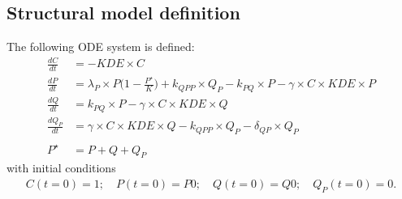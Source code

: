 \subsection{Structural model definition}
The following ODE system is defined:
\begin{align*}
\frac{dC}{dt} &= -\textit{KDE} \times C  \nonumber \\
\frac{dP}{dt} &= \lambda_P \times P \Big( 1 - \frac{P^\star}{K} \Big) + k_{\textit{QPP}} \times Q_P - k_{\textit{PQ}} \times P - \gamma \times C \times \textit{KDE} \times P  \nonumber \\
\frac{dQ}{dt} &= k_{PQ}\times P - \gamma \times C\times \mathit{KDE}\times Q \nonumber \\
\frac{dQ_P}{dt} &= \gamma \times C \times \textit{KDE} \times Q - k_{\textit{QPP}} \times Q_P - \delta_{\textit{QP}} \times Q_P  \nonumber \\ \nonumber \\
P^{\star} &= P + Q + Q_P \nonumber
\end{align*}
with initial conditions
\begin{align*}
C(t=0) = 1; \quad P(t=0) = P0; \quad Q(t=0) = Q0; \quad Q_P(t=0) = 0.  \nonumber
\end{align*}

